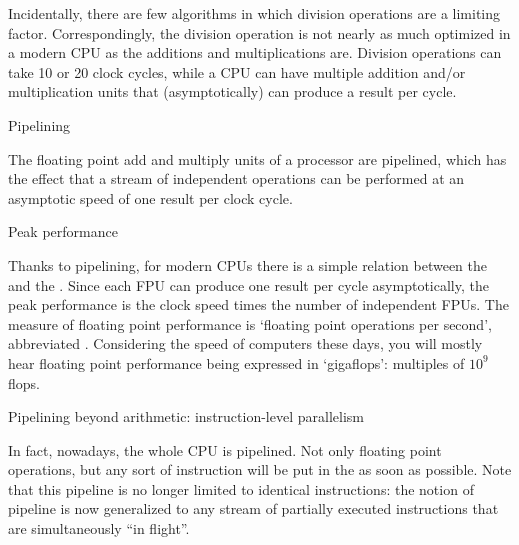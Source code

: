 Incidentally, there are few algorithms in which division operations
are a limiting factor. Correspondingly, the division operation is not
nearly as much optimized in a modern CPU as the additions and
multiplications are. Division operations can take 10 or 20 clock
cycles, while a CPU can have multiple addition and/or multiplication
units that (asymptotically) can produce a result per cycle.


 {Pipelining}
\label{sec:pipeline}

The floating point add and multiply units of a processor are
pipelined, which has the effect that a stream of independent
operations can be performed at an asymptotic speed of one result per
clock cycle.




 {Peak performance}

Thanks to pipelining, for modern CPUs there is a simple relation
between the  and the .
Since each \ac{FPU} can produce one result per cycle
asymptotically, the peak performance is the clock speed times the
number of independent \acp{FPU}. The measure of floating
point performance is `floating point operations per second',
abbreviated . Considering the speed of computers
these days, you will mostly hear floating point performance being
expressed in `gigaflops': multiples of $10^9$ flops.

 {Pipelining beyond arithmetic: instruction-level parallelism}
\label{sec:pipelinecpu}

In fact, nowadays, the whole CPU is pipelined. Not only floating point
operations, but any sort of instruction will be put in the
 as soon
as possible. Note that this pipeline is no longer limited to identical
instructions: the notion of pipeline is now generalized to any stream
of partially executed instructions that are simultaneously ``in
flight''.

